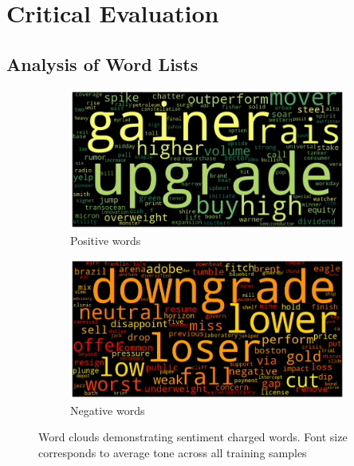\chapter{Critical Evaluation}
\label{chap:evaluation}

\section{Analysis of Word Lists}
\label{sec:word-list-analysis}
\begin{figure}[ht]
\begin{subfigure}[b]{\textwidth}
\centering
\includegraphics[scale=0.4]{pics/positive.png}
\caption{Positive words}
\end{subfigure}

\begin{subfigure}[b]{\textwidth}
\centering
\includegraphics[scale=0.4]{pics/negative.png}
\caption{Negative words}
\end{subfigure}
\caption[Word clouds]{Word clouds demonstrating sentiment charged words. Font size corresponds to average tone across all training samples}
\label{wordclouds}
\end{figure}

